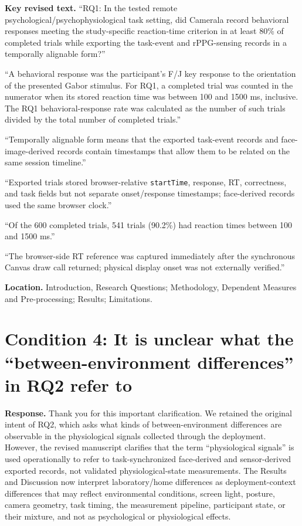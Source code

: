 \documentclass[11pt]{article}
\newcommand{\condition}[2]{\section*{Condition #1: #2}}
\begin{document}
\textbf{Key revised text.}
``RQ1: In the tested remote psychological/psychophysiological task setting, did Camerala record behavioral responses meeting the study-specific reaction-time criterion in at least 80\% of completed trials while exporting the task-event and rPPG-sensing records in a temporally alignable form?''

``A behavioral response was the participant's F/J key response to the orientation of the presented Gabor stimulus. For RQ1, a completed trial was counted in the numerator when its stored reaction time was between 100 and 1500 ms, inclusive. The RQ1 behavioral-response rate was calculated as the number of such trials divided by the total number of completed trials.''

``Temporally alignable form means that the exported task-event records and face-image-derived records contain timestamps that allow them to be related on the same session timeline.''

``Exported trials stored browser-relative \texttt{startTime}, response, RT, correctness, and task fields but not separate onset/response timestamps; face-derived records used the same browser clock.''

``Of the 600 completed trials, 541 trials (90.2\%) had reaction times between 100 and 1500 ms.''

``The browser-side RT reference was captured immediately after the synchronous Canvas draw call returned; physical display onset was not externally verified.''

\textbf{Location.}
Introduction, Research Questions; Methodology, Dependent Measures and Pre-processing; Results; Limitations.

\condition{4}{It is unclear what the ``between-environment differences'' in RQ2 refer to}
\textbf{Response.}
Thank you for this important clarification.
We retained the original intent of RQ2, which asks what kinds of between-environment differences are observable in the physiological signals collected through the deployment.
However, the revised manuscript clarifies that the term ``physiological signals'' is used operationally to refer to task-synchronized face-derived and sensor-derived exported records, not validated physiological-state measurements.
The Results and Discussion now interpret laboratory/home differences as deployment-context differences that may reflect environmental conditions, screen light, posture, camera geometry, task timing, the measurement pipeline, participant state, or their mixture, and not as psychological or physiological effects.
\end{document}
